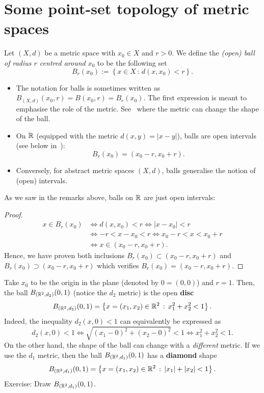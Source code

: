 \section{Some point-set topology of metric spaces}
\label{sec:point_set}
\begin{defn}[Balls]
\label{defn:ball}
Let $(X,d)$ be a metric space with $x_0\in X$ and $r>0$. We define the \textit{(open) ball of radius $r$ centred around $x_0$} to be the following set
\[
B_r(x_0):= \left\{
x\in X \, : \, d(x,x_0)<r
\right\}.
\]
\end{defn}
\begin{rem}
	\begin{itemize}
		\item The notation for balls is sometimes written as $B_{(X,d)}(x_0,r) =B(x_0,r) = B_r(x_0)$. The first expression is meant to emphasise the role of the metric. See~ where the metric can change the shape of the ball.
		\item On $\R$ (equipped with the metric $d(x,y) = |x-y|$), balls are open intervals (see below in~):
		\[
		B_r(x_0) = (x_0-r,x_0+r).
		\]
		\item Conversely, for abstract metric spaces $(X,d)$, balls generalise the notion of (open) intervals.
	\end{itemize}
\end{rem}
\begin{eg}[Balls on $\R$]
	\label{eg:ball_R}
	As we saw in the remarks above, balls on $\R$ are just open intervals:
	\begin{proof}
	\begin{align*}
		x \in B_r(x_0) 	&\iff d(x,x_0)< r \iff |x-x_0| < r 	\\
		&\iff -r < x-x_0 < r \iff x_0-r<x<x_0+r 	\\
		&\iff x\in (x_0-r,x_0+r).
	\end{align*}
	Hence, we have proven both inclusions $B_r(x_0) \subset (x_0-r,x_0+r)$ and $B_r(x_0) \supset (x_0-r,x_0+r)$ which verifies $B_r(x_0) = (x_0-r,x_0+r)$.
	\end{proof}
\end{eg}
\begin{eg}[Balls on $\R^2$]
	\label{eg:ball_metric}
	Take $x_0$ to be the origin in the plane (denoted by $0 = (0,0)$) and $r=1$. Then, the ball $B_{(\mathbb{R}^2,d_2)}(0,1)$ (notice the $d_2$ metric) is the open \textbf{disc}
	\[
	B_{(\mathbb{R}^2,d_2)}(0,1) = \left\{
	x = (x_1,x_2) \in \mathbb{R}^2 \, : \, x_1^2 + x_2^2 < 1 
	\right\}.
	\]
	Indeed, the inequality $d_2(x,0) < 1$ can equivalently be expressed as
	\[
	d_2(x,0) < 1 \iff \sqrt{(x_1-0)^2 + (x_2-0)^2}< 1 \iff x_1^2 + x_2^2 < 1.
	\]
	On the other hand, the shape of the ball can change with a \textit{different} metric. If we use the $d_1$ metric, then the ball $B_{(\mathbb{R}^2,d_1)}(0,1)$ has a \textbf{diamond} shape
	\[
	B_{(\mathbb{R}^2,d_1)}(0,1) = \left\{
	x = (x_1,x_2)\in \mathbb{R}^2 \, : \, |x_1| + |x_2| < 1
	\right\}.
	\]
	Exercise: Draw $B_{(\mathbb{R}^2,d_1)}(0,1)$.
\end{eg}
